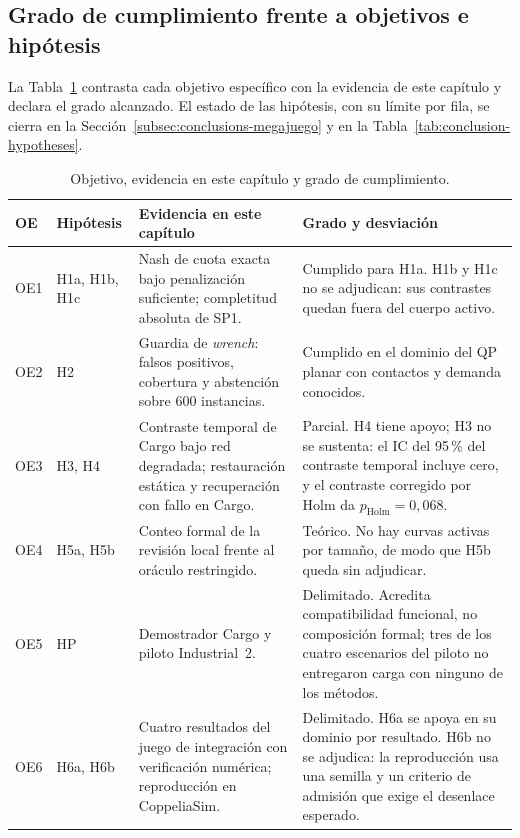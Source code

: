 \subsection{Grado de cumplimiento frente a objetivos e hipótesis}
\label{subsec:results-compliance}

La Tabla~\ref{tab:results-compliance} contrasta cada objetivo específico con la
evidencia de este capítulo y declara el grado alcanzado. El estado de las
hipótesis, con su límite por fila, se cierra en la
Sección~\ref{subsec:conclusions-megajuego} y en la
Tabla~\ref{tab:conclusion-hypotheses}.

\begin{table}[H]
  \centering
  \caption{Objetivo, evidencia en este capítulo y grado de cumplimiento.}
  \label{tab:results-compliance}
  \scriptsize
  \setlength{\tabcolsep}{3pt}
  \begin{tabularx}{\textwidth}{@{}p{0.7cm}p{1.1cm}p{4.9cm}X@{}}
    \toprule
    OE & Hipótesis & Evidencia en este capítulo & Grado y desviación \\
    \midrule
    OE1 & H1a, H1b, H1c & Nash de cuota exacta bajo penalización suficiente; completitud absoluta de SP1. & Cumplido para H1a. H1b y H1c no se adjudican: sus contrastes quedan fuera del cuerpo activo. \\
    OE2 & H2 & Guardia de \emph{wrench}: falsos positivos, cobertura y abstención sobre 600 instancias. & Cumplido en el dominio del QP planar con contactos y demanda conocidos. \\
    OE3 & H3, H4 & Contraste temporal de Cargo bajo red degradada; restauración estática y recuperación con fallo en Cargo. & Parcial. H4 tiene apoyo; H3 no se sustenta: el IC del 95\,\% del contraste temporal incluye cero, y el contraste corregido por Holm da $p_{\mathrm{Holm}}=0{,}068$. \\
    OE4 & H5a, H5b & Conteo formal de la revisión local frente al oráculo restringido. & Teórico. No hay curvas activas por tamaño, de modo que H5b queda sin adjudicar. \\
    OE5 & HP & Demostrador Cargo y piloto Industrial~2. & Delimitado. Acredita compatibilidad funcional, no composición formal; tres de los cuatro escenarios del piloto no entregaron carga con ninguno de los métodos. \\
    OE6 & H6a, H6b & Cuatro resultados del juego de integración con verificación numérica; reproducción en CoppeliaSim. & Delimitado. H6a se apoya en su dominio por resultado. H6b no se adjudica: la reproducción usa una semilla y un criterio de admisión que exige el desenlace esperado. \\
    \bottomrule
  \end{tabularx}
  \viuownsource
\end{table}

